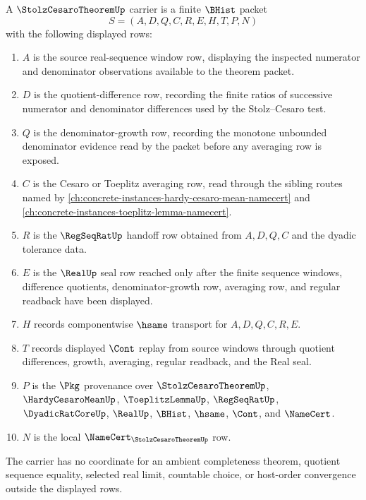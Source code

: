 \begin{definition}
\label{def:stolz-cesaro-theorem-carrier}
A $\StolzCesaroTheoremUp$ carrier is a finite $\BHist$ packet
$$
S=(A,D,Q,C,R,E,H,T,P,N)
$$
with the following displayed rows:
\begin{enumerate}
\item $A$ is the source real-sequence window row, displaying the inspected numerator and denominator observations available to the theorem packet.
\item $D$ is the quotient-difference row, recording the finite ratios of successive numerator and denominator differences used by the Stolz--Cesaro test.
\item $Q$ is the denominator-growth row, recording the monotone unbounded denominator evidence read by the packet before any averaging row is exposed.
\item $C$ is the Cesaro or Toeplitz averaging row, read through the sibling routes named by \autoref{ch:concrete-instances-hardy-cesaro-mean-namecert} and \autoref{ch:concrete-instances-toeplitz-lemma-namecert}.
\item $R$ is the $\RegSeqRatUp$ handoff row obtained from $A,D,Q,C$ and the dyadic tolerance data.
\item $E$ is the $\RealUp$ seal row reached only after the finite sequence windows, difference quotients, denominator-growth row, averaging row, and regular readback have been displayed.
\item $H$ records componentwise $\hsame$ transport for $A,D,Q,C,R,E$.
\item $T$ records displayed $\Cont$ replay from source windows through quotient differences, growth, averaging, regular readback, and the Real seal.
\item $P$ is the $\Pkg$ provenance over $\StolzCesaroTheoremUp$, $\HardyCesaroMeanUp$, $\ToeplitzLemmaUp$, $\RegSeqRatUp$, $\DyadicRatCoreUp$, $\RealUp$, $\BHist$, $\hsame$, $\Cont$, and $\NameCert$.
\item $N$ is the local $\NameCert_{\StolzCesaroTheoremUp}$ row.
\end{enumerate}
The carrier has no coordinate for an ambient completeness theorem, quotient sequence equality, selected real limit, countable choice, or host-order convergence outside the displayed rows.
\end{definition}

